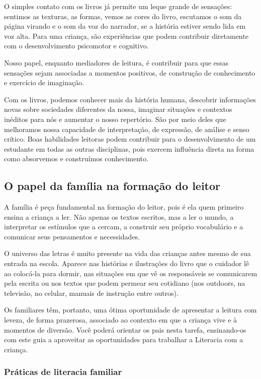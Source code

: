\documentclass[11pt]{extarticle}
\begin{document}
O simples contato com os livros já permite um leque grande de sensações: 
sentimos as texturas, as formas, vemos as cores do livro, escutamos o som da página 
virando e o som da voz do narrador, se a história estiver sendo lida em voz alta. Para uma criança, são experiências que podem contribuir diretamente com o desenvolvimento psicomotor 
e cognitivo. 

Nosso papel, enquanto mediadores de leitura, é contribuir para que essas 
sensações sejam associadas a momentos positivos, de construção de 
conhecimento e exercício de imaginação. 

Com os livros, podemos conhecer mais da história humana, descobrir informações 
novas sobre sociedades diferentes da nossa, imaginar situações e contextos inéditos 
para nós e aumentar o nosso repertório. São por meio deles que melhoramos nossa 
capacidade de interpretação, de expressão, de análise e senso crítico. Boas habilidades 
leitoras podem contribuir para o desenvolvimento de um estudante em todas as outras 
disciplinas, pois exercem influência direta na forma como absorvemos e 
construímos conhecimento.


\subsection{O papel da família na formação do leitor}
A família é peça fundamental na formação do leitor, pois é ela quem primeiro 
ensina a criança a ler. Não apenas os textos escritos, mas a ler o mundo, a 
interpretar os estímulos que a cercam, a construir seu próprio vocabulário e a 
comunicar seus pensamentos e necessidades.

O universo das letras é muito presente na vida das crianças antes mesmo de sua 
entrada na escola. Aparece nas histórias e ilustrações do livro que o cuidador 
lê ao colocá-la para dormir, nas situações em que vê os responsáveis se comunicarem 
pela escrita ou nos textos que podem permear seu cotidiano (nos outdoors, na 
televisão, no celular, manuais de instrução entre outros). 

Os familiares têm, 
portanto, uma ótima oportunidade de apresentar a leitura com leveza, de forma 
prazerosa, associado ao contexto em que a criança vive e à momentos de diversão. 
Você poderá orientar os pais nesta tarefa, ensinando-os com este guia a aproveitar 
as oportunidades para trabalhar a Literacia com a criança.


\subsubsection{Práticas de literacia familiar} 
\end{document}
